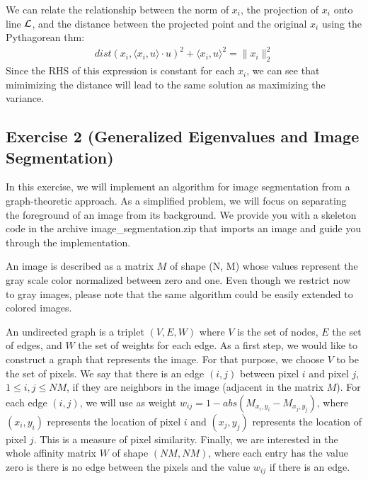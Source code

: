 \documentclass[11pt]{article}
\begin{document}
\begin{solution}
\begin{enumerate}
    We can relate the relationship between the norm of $x_i$, the projection of $x_i$ onto line $\cal L$, and the distance between the projected point and the original $x_i$ using the Pythagorean thm:
    \begin{align*}
        dist(x_i, \langle x_i,u \rangle \cdot u)^2 + \langle x_i,u \rangle^2 = \|x_i\|_2^2
    \end{align*}
    Since the RHS of this expression is constant for each $x_i$, we can see that mimimizing the distance will lead to the same solution as maximizing the variance.
\end{enumerate}
\end{solution}

\newpage
\subsection*{Exercise 2 (Generalized Eigenvalues and Image Segmentation)}

In this exercise, we will implement an algorithm for image segmentation from a graph-theoretic approach. As a simplified problem, we will focus on separating the foreground of an image from its background. We provide you with a skeleton code in the archive image\_segmentation.zip that imports an image and guide you through the implementation.

An image is described as a matrix $M$ of shape (N, M) whose values represent the gray scale color normalized between zero and one. Even though we restrict now to gray images, please note that the same algorithm could be easily extended to colored images.

An undirected graph is a triplet $(V, E, W)$ where $V$ is the set of nodes, $E$ the set of edges, and $W$ the set of weights for each edge. As a first step, we would like to construct a graph that represents the image. For that purpose, we choose $V$ to be the set of pixels. We say that there is an edge $(i, j)$ between pixel $i$ and pixel $j$, $1 \leq i, j \leq NM$, if they are neighbors in the image (adjacent in the matrix $M$). For each edge $(i, j)$, we will use as weight $w_{ij} = 1 - abs(M_{x_i, y_i} - M_{x_j, y_j})$, where $(x_i, y_i)$ represents the location of pixel $i$ and $(x_j, y_j)$ represents the location of pixel $j$. This is a measure of pixel similarity. Finally, we are interested in the whole affinity matrix $W$ of shape $(NM, NM)$, where each entry has the value zero is there is no edge between the pixels and the value $w_{ij}$ if there is an edge.
\end{document}
